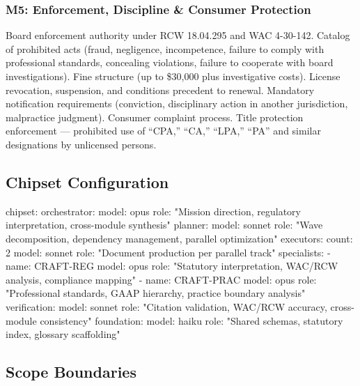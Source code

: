 \documentclass[11pt,letterpaper]{article}
\begin{document}
\subsubsection{M5: Enforcement, Discipline \& Consumer Protection}
Board enforcement authority under RCW 18.04.295 and WAC 4-30-142. Catalog of prohibited acts (fraud, negligence, incompetence, failure to comply with professional standards, concealing violations, failure to cooperate with board investigations). Fine structure (up to \$30,000 plus investigative costs). License revocation, suspension, and conditions precedent to renewal. Mandatory notification requirements (conviction, disciplinary action in another jurisdiction, malpractice judgment). Consumer complaint process. Title protection enforcement --- prohibited use of ``CPA,'' ``CA,'' ``LPA,'' ``PA'' and similar designations by unlicensed persons.

\subsection{Chipset Configuration}

\begin{asciibox}
chipset:
  orchestrator:
    model: opus
    role: "Mission direction, regulatory interpretation, cross-module synthesis"
  planner:
    model: sonnet
    role: "Wave decomposition, dependency management, parallel optimization"
  executors:
    count: 2
    model: sonnet
    role: "Document production per parallel track"
  specialists:
    - name: CRAFT-REG
      model: opus
      role: "Statutory interpretation, WAC/RCW analysis, compliance mapping"
    - name: CRAFT-PRAC
      model: opus
      role: "Professional standards, GAAP hierarchy, practice boundary analysis"
  verification:
    model: sonnet
    role: "Citation validation, WAC/RCW accuracy, cross-module consistency"
  foundation:
    model: haiku
    role: "Shared schemas, statutory index, glossary scaffolding"
\end{asciibox}

\subsection{Scope Boundaries}
\end{document}
